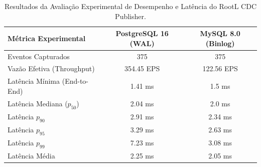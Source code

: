 
\begin{table}[H]
\centering
\caption{Resultados da Avaliação Experimental de Desempenho e Latência do RootL CDC Publisher.}
\label{tab:benchmark_results}
\begin{tabular}{|l|c|c|}
\hline
\textbf{Métrica Experimental} & \textbf{PostgreSQL 16 (WAL)} & \textbf{MySQL 8.0 (Binlog)} \\
\hline
Eventos Capturados & 375 & 375 \\
\hline
Vazão Efetiva (Throughput) & 354.45 EPS & 122.56 EPS \\
\hline
Latência Mínima (End-to-End) & 1.41 ms & 1.5 ms \\
\hline
Latência Mediana ($p_{50}$) & 2.04 ms & 2.0 ms \\
\hline
Latência $p_{90}$ & 2.91 ms & 2.34 ms \\
\hline
Latência $p_{95}$ & 3.29 ms & 2.63 ms \\
\hline
Latência $p_{99}$ & 7.23 ms & 3.08 ms \\
\hline
Latência Média & 2.25 ms & 2.05 ms \\
\hline
\end{tabular}
\end{table}
